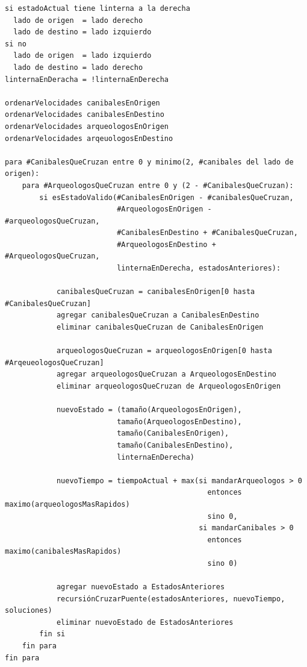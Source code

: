        \begin{codesnippet}
        \begin{verbatim}
si estadoActual tiene linterna a la derecha
  lado de origen  = lado derecho
  lado de destino = lado izquierdo
si no
  lado de origen  = lado izquierdo
  lado de destino = lado derecho
linternaEnDeracha = !linternaEnDerecha

ordenarVelocidades canibalesEnOrigen
ordenarVelocidades canibalesEnDestino
ordenarVelocidades arqueologosEnOrigen
ordenarVelocidades arqeuologosEnDestino

para #CanibalesQueCruzan entre 0 y minimo(2, #canibales del lado de origen):
    para #ArqueologosQueCruzan entre 0 y (2 - #CanibalesQueCruzan):
        si esEstadoValido(#CanibalesEnOrigen - #canibalesQueCruzan,
                          #ArqueologosEnOrigen - #arqueologosQueCruzan,
                          #CanibalesEnDestino + #CanibalesQueCruzan,
                          #ArqueologosEnDestino + #ArqueologosQueCruzan,
                          linternaEnDerecha, estadosAnteriores):

            canibalesQueCruzan = canibalesEnOrigen[0 hasta #CanibalesQueCruzan]
            agregar canibalesQueCruzan a CanibalesEnDestino
            eliminar canibalesQueCruzan de CanibalesEnOrigen

            arqueologosQueCruzan = arqueologosEnOrigen[0 hasta #ArqeueologosQueCruzan]
            agregar arqueologosQueCruzan a ArqueologosEnDestino
            eliminar arqueologosQueCruzan de ArqueologosEnOrigen

            nuevoEstado = (tamaño(ArqueologosEnOrigen),
                          tamaño(ArqueologosEnDestino),
                          tamaño(CanibalesEnOrigen),
                          tamaño(CanibalesEnDestino),
                          linternaEnDerecha)

            nuevoTiempo = tiempoActual + max(si mandarArqueologos > 0
                                               entonces maximo(arqueologosMasRapidos)
                                               sino 0,
                                             si mandarCanibales > 0
                                               entonces maximo(canibalesMasRapidos)
                                               sino 0)

            agregar nuevoEstado a EstadosAnteriores
            recursiónCruzarPuente(estadosAnteriores, nuevoTiempo, soluciones)
            eliminar nuevoEstado de EstadosAnteriores
        fin si
    fin para
fin para
        \end{verbatim}
        \end{codesnippet}

